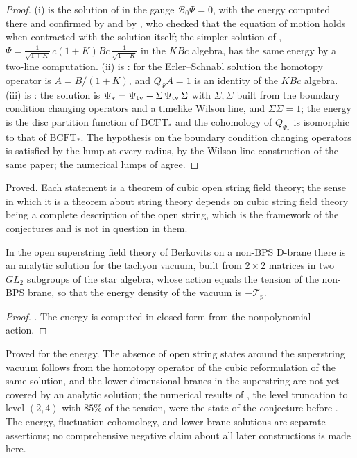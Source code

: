 \begin{proof}
(i) is the solution of \cite{Schnabl05} in the gauge $\mathcal B_0\Psi = 0$, with the energy computed there and confirmed by \cite{Okawa06} and by \cite{FuchsKroyter06}, who checked that the equation of motion holds when contracted with the solution itself; the simpler solution of \cite{ErlerSchnabl09}, $\Psi = \frac{1}{\sqrt{1+K}}\,c(1+K)Bc\,\frac{1}{\sqrt{1+K}}$ in the $KBc$ algebra, has the same energy by a two-line computation. (ii) is \cite{EllwoodSchnabl07}: for the Erler--Schnabl solution the homotopy operator is $A = B/(1+K)$, and $Q_\Psi A = 1$ is an identity of the $KBc$ algebra. (iii) is \cite[Section~4]{ErlerMaccaferri14}: the solution is $\Psi_* = \Psi_{\rm tv} - \Sigma\,\Psi_{\rm tv}\,\bar\Sigma$ with $\Sigma,\bar\Sigma$ built from the boundary condition changing operators and a timelike Wilson line, and $\bar\Sigma\Sigma = 1$; the energy is the disc partition function of $\mathrm{BCFT}_*$ and the cohomology of $Q_{\Psi_*}$ is isomorphic to that of $\mathrm{BCFT}_*$. The hypothesis on the boundary condition changing operators is satisfied by the lump at every radius, by the Wilson line construction of the same paper; the numerical lumps of \cite{KudrnaSchnabl18} agree.
\end{proof}

\begin{verdict}[claims 12, 13, 14]
Proved. Each statement is a theorem of cubic open string field theory; the sense in which it is a theorem about string theory depends on cubic string field theory being a complete description of the open string, which is the framework of the conjectures and is not in question in them.
\end{verdict}

\begin{theorem}\label{thm:superstring}
In the open superstring field theory of Berkovits on a non-BPS D-brane there is an analytic solution for the tachyon vacuum, built from $2\times 2$ matrices in two $GL_2$ subgroups of the star algebra, whose action equals the tension of the non-BPS brane, so that the energy density of the vacuum is $-\mathcal T_p$.
\end{theorem}

\begin{proof}
\cite{Erler13}. The energy is computed in closed form from the nonpolynomial action.
\end{proof}

\begin{verdict}[claim 15]
Proved for the energy. The absence of open string states around the superstring vacuum follows from the homotopy operator of the cubic reformulation of the same solution, and the lower-dimensional branes in the superstring are not yet covered by an analytic solution; the numerical results of \cite{BSZ00}, the level truncation to level $(2,4)$ with $85\%$ of the tension, were the state of the conjecture before \cite{Erler13}.
 The energy, fluctuation cohomology, and lower-brane solutions are separate assertions; no comprehensive negative claim about all later constructions is made here.
\end{verdict}
